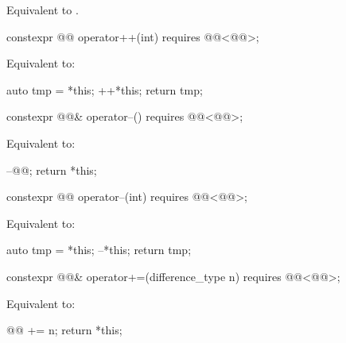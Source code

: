 \begin{itemdescr}
\pnum
\effects
Equivalent to .
\end{itemdescr}

%
\begin{itemdecl}
constexpr @@ operator++(int) requires @@<@@>;
\end{itemdecl}

\begin{itemdescr}
\pnum
\effects
Equivalent to:
\begin{codeblock}
auto tmp = *this;
++*this;
return tmp;
\end{codeblock}
\end{itemdescr}

%
\begin{itemdecl}
constexpr @@& operator--() requires @@<@@>;
\end{itemdecl}

\begin{itemdescr}
\pnum
\effects
Equivalent to:
\begin{codeblock}
--@@;
return *this;
\end{codeblock}
\end{itemdescr}

%
\begin{itemdecl}
constexpr @@ operator--(int) requires @@<@@>;
\end{itemdecl}

\begin{itemdescr}
\pnum
\effects
Equivalent to:
\begin{codeblock}
auto tmp = *this;
--*this;
return tmp;
\end{codeblock}
\end{itemdescr}

%
\begin{itemdecl}
constexpr @@& operator+=(difference_type n)
  requires @@<@@>;
\end{itemdecl}

\begin{itemdescr}
\pnum
\effects
Equivalent to:
\begin{codeblock}
@@ += n;
return *this;
\end{codeblock}
\end{itemdescr}

